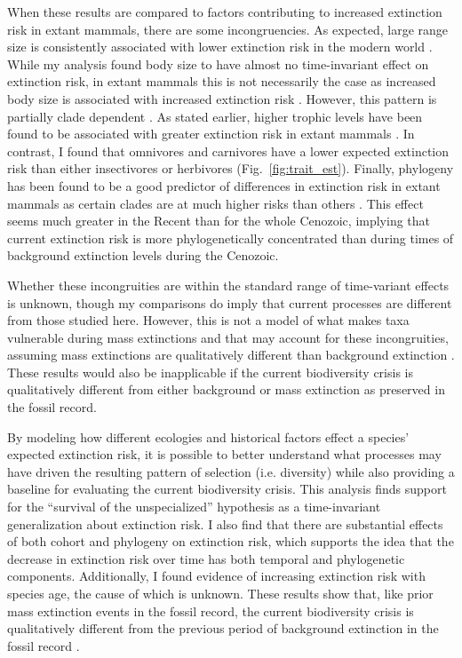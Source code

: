 \documentclass{pnastwo}
\begin{document}
\begin{article}
When these results are compared to factors contributing to increased extinction risk in extant mammals, there are some incongruencies. As expected, large range size is consistently associated with lower extinction risk in the modern world \cite{Liow2009,Purvis2000a,Fritz2009,Fritz2010b}. While my analysis found body size to have almost no time-invariant effect on extinction risk, in extant mammals this is not necessarily the case as increased body size is associated with increased extinction risk \cite{Liow2009,Purvis2000a}. However, this pattern is partially clade dependent \cite{Fritz2009}. As stated earlier, higher trophic levels have been found to be associated with greater extinction risk in extant mammals \cite{Liow2009,Purvis2000a}. In contrast, I found that omnivores and carnivores have a lower expected extinction risk than either insectivores or herbivores (Fig.~\ref{fig:trait_est}). Finally, phylogeny has been found to be a good predictor of differences in extinction risk in extant mammals as certain clades are at much higher risks than others \cite{Fritz2010b}. This effect seems much greater in the Recent than for the whole Cenozoic, implying that current extinction risk is more phylogenetically concentrated than during times of background extinction levels during the Cenozoic.

Whether these incongruities are within the standard range of time-variant effects is unknown, though my comparisons do imply that current processes are different from those studied here. However, this is not a model of what makes taxa vulnerable during mass extinctions and that may account for these incongruities, assuming mass extinctions are qualitatively different than background extinction \cite{Jablonski1986}. These results would also be inapplicable if the current biodiversity crisis is qualitatively different from either background or mass extinction as preserved in the fossil record.

By modeling how different ecologies and historical factors effect a species' expected extinction risk, it is possible to better understand what processes may have driven the resulting pattern of selection (i.e. diversity) while also providing a baseline for evaluating the current biodiversity crisis. This analysis finds support for the ``survival of the unspecialized'' hypothesis \cite{Simpson1944,Liow2004a} as a time-invariant generalization about extinction risk. I also find that there are substantial effects of both cohort and phylogeny on extinction risk, which supports the idea that the decrease in extinction risk \cite{Raup1982a} over time has both temporal and phylogenetic components. Additionally, I found evidence of increasing extinction risk with species age, the cause of which is unknown. These results show that, like prior mass extinction events in the fossil record, the current biodiversity crisis is qualitatively different from the previous period of background extinction in the fossil record \cite{Jablonski1986}.



\end{article}
\end{document}
